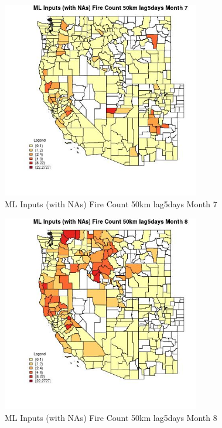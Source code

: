 \begin{figure} 
\centering  
\includegraphics[width=0.77\textwidth]{Code_Outputs/Report_ML_input_PM25_Step4_part_f_de_duplicated_aves_prioritize_24hr_obswNAs_CountyFire_Count_50km_lag5daysmedianMonth7.jpg} 
\caption{\label{fig:Report_ML_input_PM25_Step4_part_f_de_duplicated_aves_prioritize_24hr_obswNAsCountyFire_Count_50km_lag5daysmedianMonth7}ML Inputs (with NAs) Fire Count 50km lag5days Month 7} 
\end{figure} 
 

\begin{figure} 
\centering  
\includegraphics[width=0.77\textwidth]{Code_Outputs/Report_ML_input_PM25_Step4_part_f_de_duplicated_aves_prioritize_24hr_obswNAs_CountyFire_Count_50km_lag5daysmedianMonth8.jpg} 
\caption{\label{fig:Report_ML_input_PM25_Step4_part_f_de_duplicated_aves_prioritize_24hr_obswNAsCountyFire_Count_50km_lag5daysmedianMonth8}ML Inputs (with NAs) Fire Count 50km lag5days Month 8} 
\end{figure} 
 

